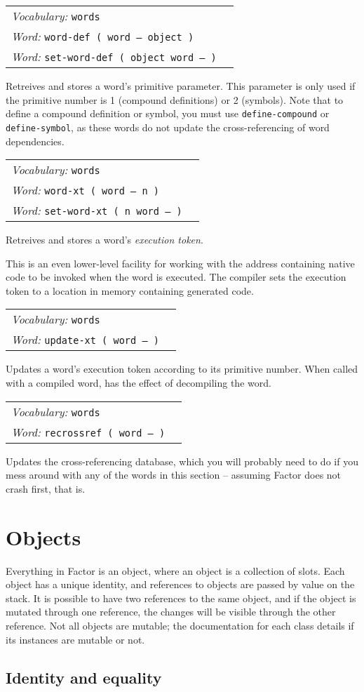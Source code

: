 \documentclass{book}
\newcommand{\vocabulary}[1]{\emph{Vocabulary:} \texttt{#1}&\\}
\newcommand{\ordinaryword}[2]{\index{\texttt{#1}}\emph{Word:} \texttt{#2}&\\}
\newcommand{\wordtable}[1]{


\begin{tabularx}{12cm}{lX}
\hline
#1
\hline
\end{tabularx}

}
\begin{document}
\wordtable{
\vocabulary{words}
\ordinaryword{word-def}{word-def ( word -- object )}
\ordinaryword{set-word-def}{set-word-def ( object word -- )}

}
Retreives and stores a word's primitive parameter. This parameter is only used if the primitive number is 1 (compound definitions) or 2 (symbols). Note that to define a compound definition or symbol, you must use \texttt{define-compound} or \texttt{define-symbol}, as these words do not update the cross-referencing of word dependencies.

\wordtable{
\vocabulary{words}
\ordinaryword{word-xt}{word-xt ( word -- n )}
\ordinaryword{set-word-xt}{set-word-xt ( n word -- )}

}
Retreives and stores a word's \emph{execution token}.

This is an even lower-level facility for working with the address containing native code to be invoked when the word is executed. The compiler sets the execution token to a location in memory containing generated code.

\wordtable{
\vocabulary{words}
\ordinaryword{update-xt}{update-xt ( word -- )}

}
Updates a word's execution token according to its primitive number. When called with a compiled word, has the effect of decompiling the word.

\wordtable{
\vocabulary{words}
\ordinaryword{recrossref}{recrossref ( word -- )}

}
Updates the cross-referencing database, which you will probably need to do if you mess around with any of the words in this section -- assuming Factor does not crash first, that is.

\chapter{Objects}

\mutableglos

Everything in Factor is an object, where an object is a collection of slots. Each object has a unique identity, and references to objects are passed by value on the stack. It is possible to have two references to the same object, and if the object is mutated through one reference, the changes will be visible through the other reference. Not all objects are mutable; the documentation for each class details if its instances are mutable or not.

\section{Identity and equality}\label{equality}
\end{document}
